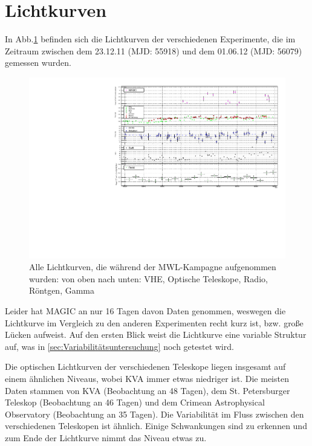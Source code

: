 \section{Lichtkurven}
In Abb.\ref{LC_MWL} befinden sich die Lichtkurven der verschiedenen Experimente, die im Zeitraum zwischen dem 23.12.11 (MJD: 55918) und dem 01.06.12 (MJD: 56079) gemessen wurden.

\begin{figure}
    \centering
    \includegraphics[width=1\textwidth]{./Plots/05_MWL/LC_final.pdf}
    \caption{Alle Lichtkurven, die während der MWL-Kampagne aufgenommen wurden: von oben nach unten: VHE, Optische Teleskope, Radio, Röntgen, Gamma}
    \label{LC_MWL}
\end{figure}

Leider hat MAGIC an nur 16 Tagen davon Daten genommen, weswegen die Lichtkurve im Vergleich zu den anderen Experimenten recht kurz ist, bzw. große Lücken aufweist.
Auf den ersten Blick weist die Lichtkurve eine variable Struktur auf, was in \autoref{sec:Variabilitätsuntersuchung} noch getestet wird.

Die optischen Lichtkurven der verschiedenen Teleskope liegen insgesamt auf einem ähnlichen Niveaus, wobei KVA immer etwas niedriger ist.
Die meisten Daten stammen von KVA (Beobachtung an 48 Tagen), dem St. Petersburger Teleskop (Beobachtung an 46 Tagen) und dem Crimean Astrophysical Observatory (Beobachtung an 35 Tagen).
Die Variabilität im Fluss zwischen den verschiedenen Teleskopen ist ähnlich. 
Einige Schwankungen sind zu erkennen und zum Ende der Lichtkurve nimmt das Niveau etwas zu.

